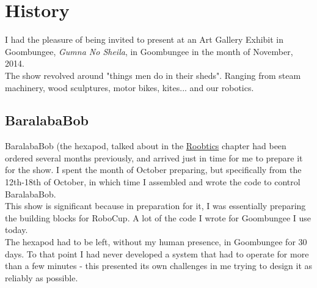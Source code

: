 \chapter{History}
    \label{chap:history}
	I had the pleasure of being invited to present at an Art Gallery Exhibit in Goombungee, \textit{Gumna No Sheila}, in Goombungee in the month of November, 2014.\\
    	
    The show revolved around "things men do in their sheds". Ranging from steam machinery, wood sculptures, motor bikes, kites... and our robotics.\\
	
	\section{BaralabaBob}
		BaralabaBob (the hexapod, talked about in the \hyperref[chap:Robotics]{Roobtics} chapter had been ordered several months previously, and arrived just in time for me to prepare it for the show. I spent the month of October preparing, but specifically from the 12th-18th of October, in which time I assembled and wrote the code to control BaralabaBob.\\
		
		This show is significant because in preparation for it, I was essentially preparing the building blocks for RoboCup. A lot of the code I wrote for Goombungee I use today.\\
		
		The hexapod had to be left, without my human presence, in Goombungee for 30 days. To that point I had never developed a system that had to operate for more than a few minutes - this presented its own challenges in me trying to design it as reliably as possible.\\
		
